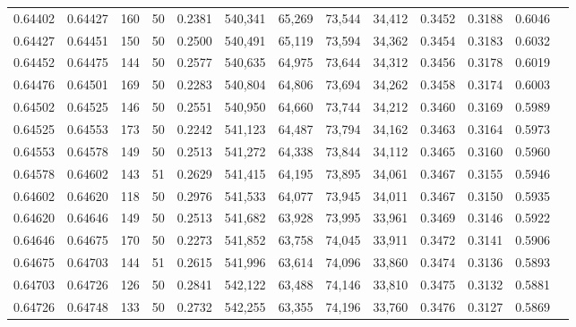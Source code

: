 \begin{tabular}{rrrrrrrrrrrrr}
0.64402 & 0.64427 &   160 &  50 &                                     0.2381 & 540,341 &  65,269 &  73,544 &  34,412 & 0.3452 & 0.3188 & 0.6046 \\
0.64427 & 0.64451 &   150 &  50 &                                     0.2500 & 540,491 &  65,119 &  73,594 &  34,362 & 0.3454 & 0.3183 & 0.6032 \\
0.64452 & 0.64475 &   144 &  50 &                                     0.2577 & 540,635 &  64,975 &  73,644 &  34,312 & 0.3456 & 0.3178 & 0.6019 \\
0.64476 & 0.64501 &   169 &  50 &                                     0.2283 & 540,804 &  64,806 &  73,694 &  34,262 & 0.3458 & 0.3174 & 0.6003 \\
0.64502 & 0.64525 &   146 &  50 &                                     0.2551 & 540,950 &  64,660 &  73,744 &  34,212 & 0.3460 & 0.3169 & 0.5989 \\
0.64525 & 0.64553 &   173 &  50 &                                     0.2242 & 541,123 &  64,487 &  73,794 &  34,162 & 0.3463 & 0.3164 & 0.5973 \\
0.64553 & 0.64578 &   149 &  50 &                                     0.2513 & 541,272 &  64,338 &  73,844 &  34,112 & 0.3465 & 0.3160 & 0.5960 \\
0.64578 & 0.64602 &   143 &  51 &                                     0.2629 & 541,415 &  64,195 &  73,895 &  34,061 & 0.3467 & 0.3155 & 0.5946 \\
0.64602 & 0.64620 &   118 &  50 &                                     0.2976 & 541,533 &  64,077 &  73,945 &  34,011 & 0.3467 & 0.3150 & 0.5935 \\
0.64620 & 0.64646 &   149 &  50 &                                     0.2513 & 541,682 &  63,928 &  73,995 &  33,961 & 0.3469 & 0.3146 & 0.5922 \\
0.64646 & 0.64675 &   170 &  50 &                                     0.2273 & 541,852 &  63,758 &  74,045 &  33,911 & 0.3472 & 0.3141 & 0.5906 \\
0.64675 & 0.64703 &   144 &  51 &                                     0.2615 & 541,996 &  63,614 &  74,096 &  33,860 & 0.3474 & 0.3136 & 0.5893 \\
0.64703 & 0.64726 &   126 &  50 &                                     0.2841 & 542,122 &  63,488 &  74,146 &  33,810 & 0.3475 & 0.3132 & 0.5881 \\
0.64726 & 0.64748 &   133 &  50 &                                     0.2732 & 542,255 &  63,355 &  74,196 &  33,760 & 0.3476 & 0.3127 & 0.5869 \\

\end{tabular}
